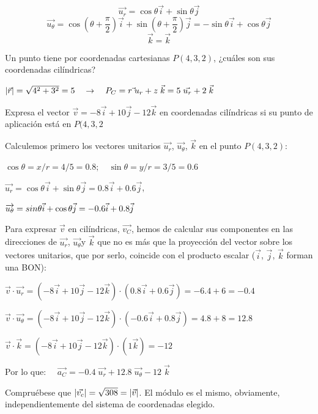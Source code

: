 $$ \overrightarrow{u_r}= \cos \theta \vec i + \sin \theta \vec j$$
$$ \overrightarrow{u_{\theta}}=\cos \left(\theta+\dfrac \pi 2 \right) \vec i + \sin \left(\theta+\dfrac \pi 2 \right) \vec j=-\sin \theta \vec i + \cos \theta \vec j$$
$$\vec k=\vec k$$

\begin{ejem}
	Un punto tiene por coordenadas cartesianas $P(4,3,2)$, ¿cuáles son sus coordenadas cilíndricas?
\end{ejem}
$\abs{\vec r}=\sqrt{4^2+3^2}=5 \quad \to \quad P_C=r\vec \;{u_r} + z \; \vec k = 5\; \vec {u_r}+2 \; \vec k$
\vspace{5mm}\begin{ejem}
Expresa el vector $\vec v=-8\vec i+10\vec j-12\vec k$ en coordenadas cilíndricas si su punto de aplicación está en $P(4,3,2$	
\end{ejem}
Calculemos primero los vectores unitarios $\overrightarrow{u_r}$, $\overrightarrow{u_{\theta}}$, $\vec k$ en el punto $P(4,3,2)$:


$\cos \theta=x/r=4/5=0.8; \quad \sin \theta=y/r=3/5=0.6$

$\overrightarrow{u_r} =\cos \theta \vec i + \sin \theta \vec j=0.8\vec i + 0.6 \vec j$, 

$\overrightarrow{u_{\theta}}=\-sin \theta \vec i + \cos \theta \vec j=-0.6\vec i + 0.8 \vec j$

\vspace{2mm}Para expresar $\vec v$ en cilíndricas, $\vec {v_C}$, hemos de calcular sus componentes en las direcciones de $\overrightarrow{u_r}$, $\overrightarrow{u_{\theta}}$y $\vec k$  que no es más que la proyección del vector sobre los vectores unitarios, que por serlo, coincide con el producto escalar ($\vec i$, $\vec j$, $\vec k$ forman una BON):

\vspace{2mm} $\vec v \cdot \vec {u_r}=(-8\vec i +10\vec j-12 \vec k)\cdot (0.8\vec i + 0.6 \vec j)=-6.4+6=-0.4$

$\vec v \cdot \vec {u_{\theta}}=(-8\vec i +10\vec j-12 \vec k)\cdot (-0.6\vec i + 0.8 \vec j)=4.8+8=12.8$

$\vec v \cdot \vec k=(-8\vec i +10\vec j-12 \vec k)\cdot (1\vec k)=-12$


Por lo que: $\quad \vec {a_C}=-0.4\; \vec {u_r}+12.8\; \vec {u_{\theta}}-12\; \vec k$

Compruébese que $\abs{\vec {v_c}}=\sqrt{308}=\abs{\vec v}$. El módulo es el mismo, obviamente, independientemente del sistema de coordenadas elegido.


